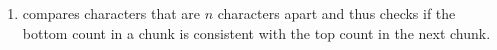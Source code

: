 \documentclass[12pt]{article}
\begin{document}
\begin{solution}
\begin{enumerate}
\begin{enumerate}
            
            
            \item [(v)] compares characters that are $n$ characters apart and thus checks if the bottom count in a chunk is consistent with the top count in the next chunk. 
            

\end{enumerate}
\end{enumerate}
\end{solution}
\end{document}
